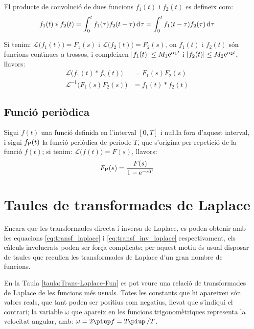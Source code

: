 El producte de convoluci\'{o} de dues funcions $f_1(t)$ i $f_2(t)$ es
defineix com:
\begin{equation}
    f_1(t) * f_2(t) = \int_0^t f_1(\tau) f_2(t-\tau) \diff\tau =
    \int_0^t f_1(t-\tau) f_2(\tau) \diff\tau
\end{equation}

Si tenim: $\mathcal{L} \bigl(f_1(t) \bigr) = F_1(s)$ i $\mathcal{L}
\bigl(f_2(t) \bigr) = F_2(s)$, on $f_1(t)$ i $f_2(t)$ s\'{o}n funcions
cont\'{\i}nues a trossos, i compleixen $|f_1(t)|\leq M_1\mathrm{e}^{\alpha_1 t}$
i $|f_2(t)|\leq M_2\mathrm{e}^{\alpha_2 t}$, llavors:
\begin{align}
    \mathcal{L} \bigl( f_1(t) * f_2(t) \bigr) &= F_1(s) F_2(s)\\
    \mathcal{L}^{-1} \bigl( F_1(s) F_2(s) \bigr) &= f_1(t) * f_2(t)
\end{align}

\subsection{Funci\'{o} peri\`{o}dica}

Sigui $f(t)$ una funci\'{o} definida en l'interval $[0,T]$ i nu{\l.l}a
fora d'aquest interval, i sigui $f_\mathrm{P}(t)$ la funci\'{o} peri\`{o}dica de
per\'{\i}ode $T$, que s'origina per repetici\'{o} de la funci\'{o} $f(t)$; si
tenim: $\mathcal{L} \bigl(f(t) \bigr) = F(s)$, llavors:
\begin{equation}
    F_\mathrm{P}(s) = \frac{F(s)}{1-\mathrm{e}^{-sT}}
\end{equation}

\section{Taules de transformades de Laplace}

Encara que les transformades directa i inversa de Laplace, es poden
obtenir amb les equacions \eqref{eq:transf_laplace} i
\eqref{eq:transf_inv_laplace} respectivament, els c\`{a}lculs
involucrats poden ser for\c{c}a complicats; per aquest motiu \'{e}s usual
disposar de taules que recullen les transformades de Laplace d'un
gran nombre de funcions.

En la Taula \vref{taula:Trans-Laplace-Fun} es pot veure una relaci\'{o} de
transformades de Laplace de les funcions m\'{e}s usuals. Totes les
constants que hi apareixen s\'{o}n valors reals, que tant poden ser
positius com negatius, llevat que s'indiqui el contrari; la variable
$\omega$ que apareix en les funcions trigonom\`{e}triques representa la
velocitat angular, amb: $\omega=2\piup f=2\piup\,/T$.

